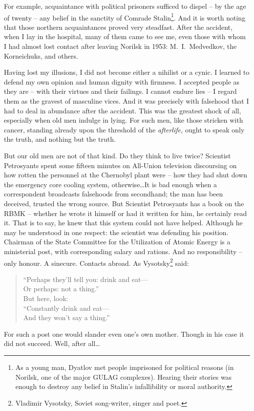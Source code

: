 \documentclass[openright]{bookest}
\begin{document}
For example, acquaintance with political prisoners sufficed to dispel -- by the age of twenty -- any belief in the sanctity of Comrade Stalin\footnote{As a young man, Dyatlov met people imprisoned for political reasons (in Norilsk, one of the major GULAG complexes). Hearing their stories was enough to destroy any belief in Stalin's infallibility or moral authority.}. And it is worth noting that those northern acquaintances proved very steadfast. After the accident, when I lay in the hospital, many of them came to see me, even those with whom I had almost lost contact after leaving Norilsk in 1953: M.~I.~Medvedkov, the Korneichuks, and others.

Having lost my illusions, I did not become either a nihilist or a cynic. I learned to defend my own opinion and human dignity with firmness. I accepted people as they are -- with their virtues and their failings. I cannot endure lies -- I regard them as the gravest of masculine vices. And it was precisely with falsehood that I had to deal in abundance after the accident. This was the greatest shock of all, especially when old men indulge in lying. For such men, like those stricken with cancer, standing already upon the threshold of the \textit{afterlife,} ought to speak only the truth, and nothing but the truth.

But our old men are not of that kind. Do they think to live twice? Scientist Petrosyants spent some fifteen minutes on All-Union television discoursing on how rotten the personnel at the Chernobyl plant were -- how they had shut down the emergency core cooling system, otherwise\ldots It is bad enough when a correspondent broadcasts falsehoods from secondhand; the man has been deceived, trusted the wrong source. But Scientist Petrosyants has a book on the RBMK -- whether he wrote it himself or had it written for him, he certainly read it. That is to say, he knew that this system could not have helped. Although he may be understood in one respect: the scientist was defending his position. Chairman of the State Committee for the Utilization of Atomic Energy is a ministerial post, with corresponding salary and rations. And no responsibility -- only honour. A sinecure. Contacts abroad. As Vysotsky\footnote{Vladimir Vysotsky, Soviet song-writer, singer and poet.} said:
\begin{quote}
``Perhaps they'll tell you: drink and eat---\\
Or perhaps: not a thing.''\\[4pt]
But here, look:\\[2pt]
``Constantly drink and eat---\\
And they won't say a thing.''
\end{quote}
For such a post one would slander even one's own mother. Though in his case it did not succeed. Well, after all\ldots
\end{document}
